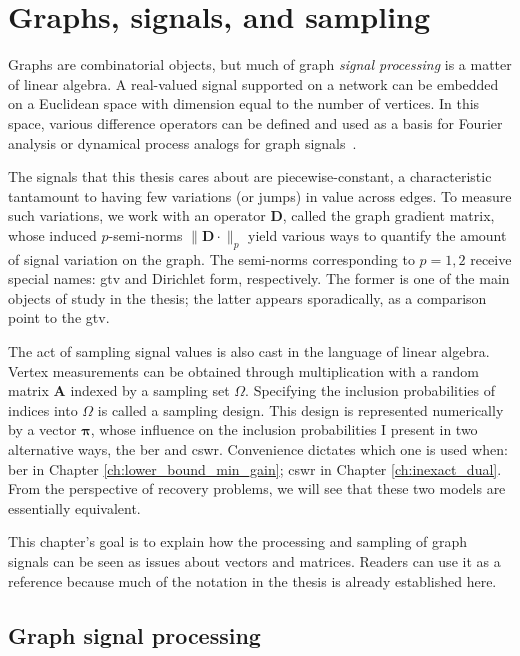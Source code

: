 \chapter{Graphs, signals, and sampling}\label{ch:graphs_signals_sampling}

Graphs are combinatorial objects, but much of graph \emph{signal processing} is a matter of linear algebra. A real-valued signal supported on a network can be embedded on a Euclidean space with dimension equal to the number of vertices. In this space, various difference operators can be defined and used as a basis for Fourier analysis or dynamical process analogs for graph signals~\cite{shuman2013}.

The signals that this thesis cares about are piecewise-constant, a characteristic tantamount to having few variations (or jumps) in value across edges. To measure such variations, we work with an operator $\mathbf{D}$, called the graph gradient matrix, whose induced $p$-semi-norms $\|\mathbf{D} \cdot \|_p$ yield various ways to quantify the amount of signal variation on the graph. The semi-norms corresponding to $p = 1, 2$ receive special names: \acrfull{gtv} and Dirichlet form, respectively. The former is one of the main objects of study in the thesis; the latter appears sporadically, as a comparison point to the \acrshort{gtv}.

The act of sampling signal values is also cast in the language of linear algebra. Vertex measurements can be obtained through multiplication with a random matrix $\mathbf{A}$ indexed by a sampling set $\Omega$. Specifying the inclusion probabilities of indices into $\Omega$ is called a sampling design. This design is represented numerically by a vector $\bm{\pi}$, whose influence on the inclusion probabilities I present in two alternative ways, the \acrfull{ber} and \acrfull{cswr}. Convenience dictates which one is used when: \acrshort{ber} in Chapter \ref{ch:lower_bound_min_gain}; \acrshort{cswr} in Chapter \ref{ch:inexact_dual}. From the perspective of recovery problems, we will see that these two models are essentially equivalent.

This chapter's goal is to explain how the processing and sampling of graph signals can be seen as issues about vectors and matrices. Readers can use it as a reference because much of the notation in the thesis is already established here.


\section{Graph signal processing}

